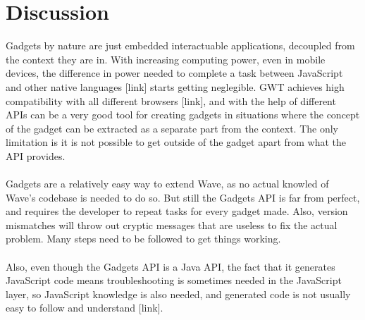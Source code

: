 \newpage
\section{Discussion}

Gadgets by nature are just embedded interactuable applications, decoupled from the context they are in. With increasing computing power, even in mobile devices, the difference in power needed to complete a task between JavaScript and other native languages [link] starts getting neglegible. GWT achieves high compatibility with all different browsers [link], and with the help of different APIs can be a very good tool for creating gadgets in situations where the concept of the gadget can be extracted as a separate part from the context. The only limitation is it is not possible to get outside of the gadget apart from what the API provides.\\\\
Gadgets are a relatively easy way to extend Wave, as no actual knowled of Wave's codebase is needed to do so. But still the Gadgets API is far from perfect, and requires the developer to repeat tasks for every gadget made. Also, version mismatches will throw out cryptic messages that are useless to fix the actual problem. Many steps need to be followed to get things working.\\\\
Also, even though the Gadgets API is a Java API, the fact that it generates JavaScript code means troubleshooting is sometimes needed in the JavaScript layer, so JavaScript knowledge is also needed, and generated code is not usually easy to follow and understand [link].
